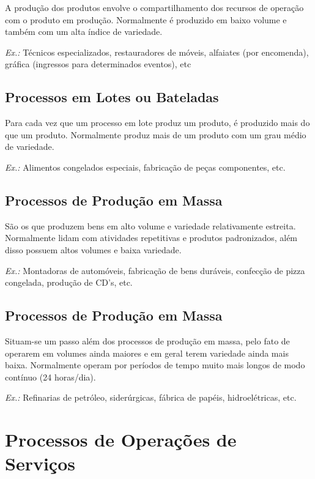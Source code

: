 				A produção dos produtos envolve o compartilhamento dos recursos de operação com o produto em produção. Normalmente é produzido em baixo volume e também com um alta índice de variedade.
				
				\emph{Ex.:} Técnicos especializados, restauradores de móveis, alfaiates (por encomenda), gráfica (ingressos para determinados eventos), etc

			\subsection[Processos em Lotes ou Bateladas]{Processos em Lotes ou Bateladas}
			\label{sec:processos_manufatura_lotes}

				Para cada vez que um processo em lote produz um produto, é produzido mais do que um produto. Normalmente produz mais de um produto com um grau médio de variedade.
				
				\emph{Ex.:} Alimentos congelados especiais, fabricação de peças componentes, etc.

			\subsection[Processos de Produção em Massa]{Processos de Produção em Massa}
			\label{sec:processos_manufatura_massa}

				São os que produzem bens em alto volume e variedade relativamente estreita. Normalmente lidam com atividades repetitivas e produtos padronizados, além disso possuem altos volumes e baixa variedade.
				
				\emph{Ex.:} Montadoras de automóveis, fabricação de bens duráveis, confecção de pizza congelada, produção de CD’s, etc.

			\subsection[Processos de Produção em Massa]{Processos de Produção em Massa}
			\label{sec:processos_manufatura_massa}

				Situam-se um passo além dos processos de produção em massa, pelo fato de operarem em volumes ainda maiores e em geral terem variedade ainda mais baixa. Normalmente operam por períodos de tempo muito mais longos de modo contínuo (24 horas/dia).
				
				\emph{Ex.:} Refinarias de petróleo, siderúrgicas, fábrica de papéis, hidroelétricas, etc.

		\section[Processos de Operações de Serviços]{Processos de Operações de Serviços}
		\label{sec:processos_servico}

